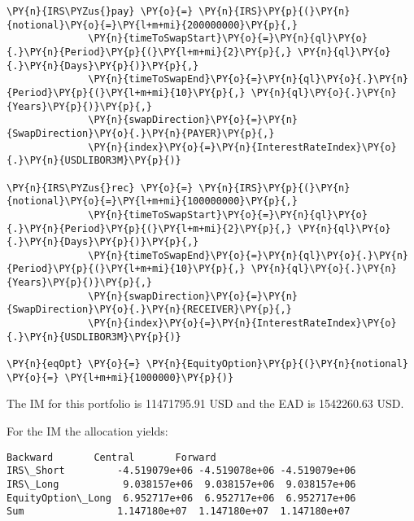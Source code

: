     \begin{tcolorbox}[breakable, size=fbox, boxrule=1pt, pad at break*=1mm,colback=cellbackground, colframe=cellborder]
\begin{Verbatim}[commandchars=\\\{\}]
\PY{n}{IRS\PYZus{}pay} \PY{o}{=} \PY{n}{IRS}\PY{p}{(}\PY{n}{notional}\PY{o}{=}\PY{l+m+mi}{200000000}\PY{p}{,}
              \PY{n}{timeToSwapStart}\PY{o}{=}\PY{n}{ql}\PY{o}{.}\PY{n}{Period}\PY{p}{(}\PY{l+m+mi}{2}\PY{p}{,} \PY{n}{ql}\PY{o}{.}\PY{n}{Days}\PY{p}{)}\PY{p}{,}
              \PY{n}{timeToSwapEnd}\PY{o}{=}\PY{n}{ql}\PY{o}{.}\PY{n}{Period}\PY{p}{(}\PY{l+m+mi}{10}\PY{p}{,} \PY{n}{ql}\PY{o}{.}\PY{n}{Years}\PY{p}{)}\PY{p}{,}
              \PY{n}{swapDirection}\PY{o}{=}\PY{n}{SwapDirection}\PY{o}{.}\PY{n}{PAYER}\PY{p}{,}
              \PY{n}{index}\PY{o}{=}\PY{n}{InterestRateIndex}\PY{o}{.}\PY{n}{USDLIBOR3M}\PY{p}{)}

\PY{n}{IRS\PYZus{}rec} \PY{o}{=} \PY{n}{IRS}\PY{p}{(}\PY{n}{notional}\PY{o}{=}\PY{l+m+mi}{100000000}\PY{p}{,}
              \PY{n}{timeToSwapStart}\PY{o}{=}\PY{n}{ql}\PY{o}{.}\PY{n}{Period}\PY{p}{(}\PY{l+m+mi}{2}\PY{p}{,} \PY{n}{ql}\PY{o}{.}\PY{n}{Days}\PY{p}{)}\PY{p}{,}
              \PY{n}{timeToSwapEnd}\PY{o}{=}\PY{n}{ql}\PY{o}{.}\PY{n}{Period}\PY{p}{(}\PY{l+m+mi}{10}\PY{p}{,} \PY{n}{ql}\PY{o}{.}\PY{n}{Years}\PY{p}{)}\PY{p}{,}
              \PY{n}{swapDirection}\PY{o}{=}\PY{n}{SwapDirection}\PY{o}{.}\PY{n}{RECEIVER}\PY{p}{,}
              \PY{n}{index}\PY{o}{=}\PY{n}{InterestRateIndex}\PY{o}{.}\PY{n}{USDLIBOR3M}\PY{p}{)}

\PY{n}{eqOpt} \PY{o}{=} \PY{n}{EquityOption}\PY{p}{(}\PY{n}{notional} \PY{o}{=} \PY{l+m+mi}{1000000}\PY{p}{)}
\end{Verbatim}
\end{tcolorbox}

    The IM for this portfolio is 11471795.91 USD and the EAD is 1542260.63
USD.

    
    For the IM the allocation yields:

            \begin{tcolorbox}[breakable, size=fbox, boxrule=.5pt, pad at break*=1mm, opacityfill=0]
\begin{Verbatim}[commandchars=\\\{\}]
                       Backward       Central       Forward
IRS\_Short         -4.519079e+06 -4.519078e+06 -4.519079e+06
IRS\_Long           9.038157e+06  9.038157e+06  9.038157e+06
EquityOption\_Long  6.952717e+06  6.952717e+06  6.952717e+06
Sum                1.147180e+07  1.147180e+07  1.147180e+07
\end{Verbatim}
\end{tcolorbox}
        
